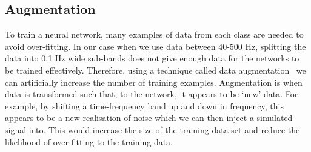 %
\begin{table}
	\caption[Parameters used for simulations of \gls{CW} signals.]{\label{machine:data:injections:table} Table shows the upper and lower limits
		over which each signal parameter was randomized. The parameters $\alpha,\sin{\left(\delta \right)},f,\;\log{\left( \dot{f} \right)},\; \cos{\left(\iota
			\right)},\; \phi_0,\; \psi$ were sampled
		uniformly in the ranges specified in the table. The frequencies $f_{\rm l}$ and $f_{\rm u}$
		refer to the lower and upper frequency of the band that each signal is injected
		into. Excluding the distribution of frequencies $f$, all the injections parameters are sampled from the same distributions as the S6
		\gls{MDC}~\cite{walsh2016ComparisonMethods}.}
\end{table}

\subsection{\label{machine:data:augmentation} Augmentation}

%
To train a neural network, many examples of data from each class are needed to avoid over-fitting.
In our case when we use data between 40-500 Hz, splitting the data into 0.1 Hz wide sub-bands does not give enough data for the
networks to be trained effectively. Therefore, using a technique called data
augmentation~\cite{patrice1991TangentProp,baird1992DocumentImage} we can
artificially increase the number of training examples.
Augmentation is when data is transformed such that, to the network, it appears to be `new'
data. 
For example, by shifting a time-frequency band up and down in frequency, this appears to be a new realisation of noise which we can then inject a simulated signal into.
This would increase the size of the training data-set and reduce the likelihood of over-fitting to the training data. 

